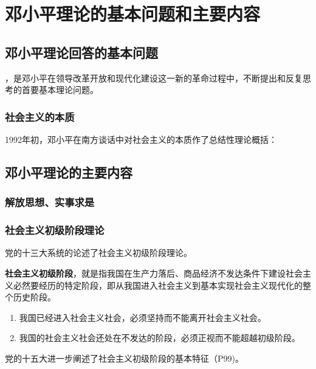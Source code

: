 \section{邓小平理论的基本问题和主要内容}
    \subsection{邓小平理论回答的基本问题}
        ，是邓小平在领导改革开放和现代化建设这一新的革命过程中，不断提出和反复思考的首要基本理论问题。

    \subsubsection{社会主义的本质} 1992年初，邓小平在南方谈话中对社会主义的本质作了总结性理论概括：

    \subsection{邓小平理论的主要内容}
        \subsubsection{解放思想、实事求是} 

        \subsubsection{社会主义初级阶段理论} 
        党的十三大系统的论述了社会主义初级阶段理论。

        \textbf{社会主义初级阶段}，就是指我国在生产力落后、商品经济不发达条件下建设社会主义必然要经历的特定阶段，即从我国进入社会主义到基本实现社会主义现代化的整个历史阶段。
        \begin{enumerate}
            \item 我国已经进入社会主义社会，必须坚持而不能离开社会主义社会。
            \item 我国的社会主义社会还处在不发达的阶段，必须正视而不能超越初级阶段。
        \end{enumerate}

        党的十五大进一步阐述了社会主义初级阶段的基本特征（P99)。

